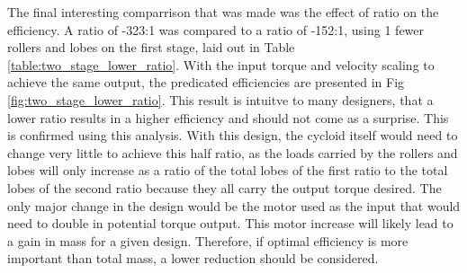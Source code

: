 The final interesting comparrison that was made was the effect of ratio on the efficiency. A ratio of -323:1 was compared to a ratio of -152:1, using 1 fewer rollers and lobes on the first stage, laid out in Table \ref{table:two_stage_lower_ratio}. With the input torque and velocity scaling to achieve the same output, the predicated efficiencies are presented in Fig \ref{fig:two_stage_lower_ratio}. This result is intuitve to many designers, that a lower ratio results in a higher efficiency and should not come as a surprise. This is confirmed using this analysis. With this design, the cycloid itself would need to change very little to achieve this half ratio, as the loads carried by the rollers and lobes will only increase as a ratio of the total lobes of the first ratio to the total lobes of the second ratio because they all carry the output torque desired. The only major change in the design would be the motor used as the input that would need to double in potential torque output. This motor increase will likely lead to a gain in mass for a given design. Therefore, if optimal efficiency is more important than total mass, a lower reduction should be considered. 


